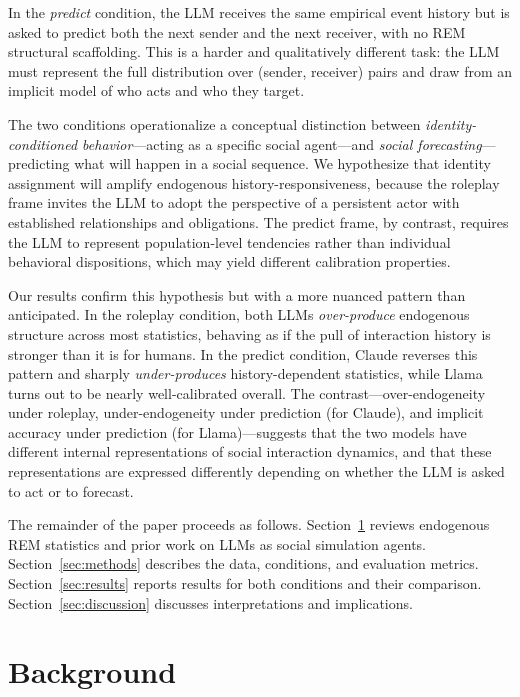 \documentclass[11pt]{article}
\begin{document}
In the \emph{predict} condition, the LLM receives the same empirical event
history but is asked to predict both the next sender and the next receiver,
with no REM structural scaffolding. This is a harder and qualitatively
different task: the LLM must represent the full distribution over
(sender, receiver) pairs and draw from an implicit model of
who acts and who they target.

The two conditions operationalize a conceptual distinction between
\emph{identity-conditioned behavior}---acting as a specific social agent---and
\emph{social forecasting}---predicting what will happen in a social sequence.
We hypothesize that identity assignment will amplify endogenous
history-responsiveness, because the roleplay frame invites the LLM to adopt
the perspective of a persistent actor with established relationships and
obligations. The predict frame, by contrast, requires the LLM to represent
population-level tendencies rather than individual behavioral dispositions,
which may yield different calibration properties.

Our results confirm this hypothesis but with a more nuanced pattern than
anticipated. In the roleplay condition, both LLMs \emph{over-produce}
endogenous structure across most statistics, behaving as if the pull of
interaction history is stronger than it is for humans. In the predict
condition, Claude reverses this pattern and sharply \emph{under-produces}
history-dependent statistics, while Llama turns out to be nearly
well-calibrated overall. The contrast---over-endogeneity under roleplay,
under-endogeneity under prediction (for Claude), and implicit accuracy under
prediction (for Llama)---suggests that the two models have different
internal representations of social interaction dynamics, and that these
representations are expressed differently depending on whether the LLM is
asked to act or to forecast.

The remainder of the paper proceeds as follows. Section~\ref{sec:background}
reviews endogenous REM statistics and prior work on LLMs as social simulation
agents. Section~\ref{sec:methods} describes the data, conditions, and
evaluation metrics. Section~\ref{sec:results} reports results for both
conditions and their comparison. Section~\ref{sec:discussion} discusses
interpretations and implications.

\section{Background}
\label{sec:background}
\end{document}
